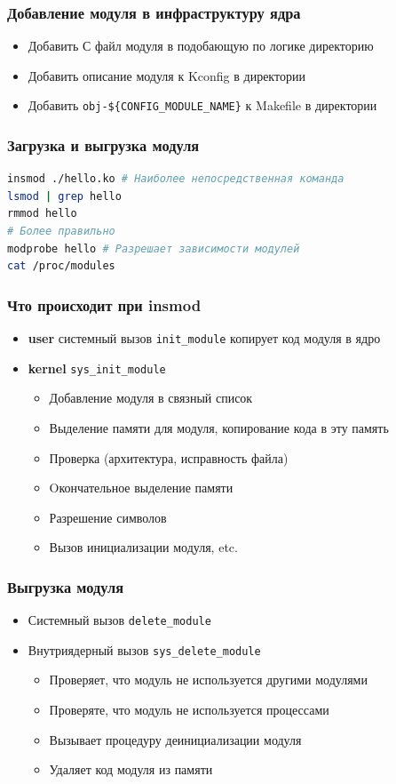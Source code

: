 \begin{frame}
  \frametitle{Добавление модуля в инфраструктуру ядра}
  \begin{itemize}
    \item Добавить С файл модуля в подобающую по логике директорию
    \item Добавить описание модуля к Kconfig в директории
    \item Добавить \texttt{obj-\$\{CONFIG\_MODULE\_NAME\}} к Makefile в директории 
  \end{itemize}
\end{frame}

\begin{frame}[fragile]
  \frametitle{Загрузка и выгрузка модуля}
\begin{lstlisting}[language=bash]
insmod ./hello.ko # Наиболее непосредственная команда
lsmod | grep hello
rmmod hello
# Более правильно
modprobe hello # Разрешает зависимости модулей
cat /proc/modules
\end{lstlisting}

\end{frame}

\begin{frame}
  \frametitle{Что происходит при insmod}
  \begin{itemize}
    \item \textbf{user} 
      системный вызов \texttt{init\_module} копирует код модуля в ядро
    \item \textbf{kernel}
      \texttt{sys\_init\_module}
      \begin{itemize}
        \item Добавление модуля в связный список
        \item Выделение памяти для модуля, копирование кода в эту память
        \item Проверка (архитектура, исправность файла)
        \item Oкончательное выделение памяти
        \item Разрешение символов
        \item Вызов инициализации модуля, etc.
      \end{itemize}
  \end{itemize}
\end{frame}

\begin{frame}
  \frametitle{Выгрузка модуля}
  \begin{itemize}
    \item Системный вызов \texttt{delete\_module}
    \item Внутриядерный вызов \texttt{sys\_delete\_module}
      \begin{itemize}
        \item Проверяет, что модуль не используется другими модулями
        \item Проверяте, что модуль не используется процессами
        \item Вызывает процедуру деинициализации модуля
        \item Удаляет код модуля из памяти
      \end{itemize}
  \end{itemize}
\end{frame}

